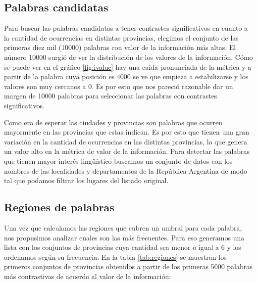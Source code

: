 \subsection{Palabras candidatas} %
\label{sub:palabras_candidatas}
Para buscar las palabras candidatas a tener contrastes significativos en cuanto a la cantidad de ocurrencias en distintas provincias, elegimos el conjunto de las primeras 
diez mil (10000) palabras con valor de la información más altas. El número 10000 surgió de ver la distribución de los valores de la información. Cómo se puede ver en 
el gráfico \ref{fig:ivalue} hay una caída pronunciada de la métrica y a partir de la palabra cuya posición es 4000 se ve que empieza a estabilizarse y los valores son 
muy cercanos a 0. Es por esto que nos pareció razonable dar un margen de 10000 palabras para seleccionar las palabras con contrastes significativos.

Como era de esperar las ciudades y provincias son palabras que ocurren mayormente en las provincias que estas indican. Es por esto que tienen una gran variación en 
la cantidad de ocurrencias en las distintas provincias, lo que genera un valor alto en la métrica de valor de la información. Para detectar las palabras que tienen 
mayor interés lingüístico buscamos un conjunto de datos con los nombres de las localidades y departamentos de la República Argentina de modo tal que podamos filtrar 
los lugares del listado original.


\subsection{Regiones de palabras} %
\label{sub:regiones_de_palabras}

Una vez que calculamos las regiones que cubren un umbral para cada palabra, nos propusimos analizar cuales son las más frecuentes. Para eso generamos una lista con los conjuntos de provincias cuya cantidad sea menor o igual a 6 y los ordenamos según su frecuencia. En la tabla \ref{tab:regiones} se muestran los primeros conjuntos de provincias obtenidos a partir de los primeras 5000 palabras más contrastivas de acuerdo al valor de la información:

